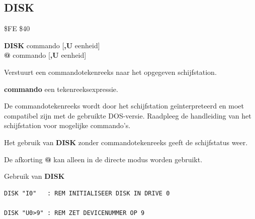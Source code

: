 
\newpage
\subsection{DISK}
\begin{description}[leftmargin=2cm,style=nextline]
\item [Token:]    \$FE \$40

\item [Formaat:]   {\bf DISK} commando [{\bf,U} eenheid] \\                 {\bf @} commando [{\bf,U} eenheid]

\item [Gebruik:]    Verstuurt een commandotekenreeks naar het opgegeven schijfstation.

                  \unitdefinition

                  {\bf commando} een tekenreeksexpressie.

\item [Opmerkingen:]  De commandotekenreeks wordt door het schijfstation geïnterpreteerd en moet compatibel zijn met de gebruikte DOS-versie. Raadpleeg de handleiding van het schijfstation voor mogelijke commando's.

                  Het gebruik van {\bf DISK} zonder commandotekenreeks geeft de schijfstatus weer.

                  De afkorting {\bf @} kan alleen in de directe modus worden gebruikt.

\item [Voorbeelden:] Gebruik van {\bf DISK}

\begin{tcolorbox}[colback=black,coltext=white]
\verbatimfont{\codefont}
\begin{verbatim}
DISK "I0"   : REM INITIALISEER DISK IN DRIVE 0

DISK "U0>9" : REM ZET DEVICENUMMER OP 9
\end{verbatim}
\end{tcolorbox}
\end{description}


\newpage
